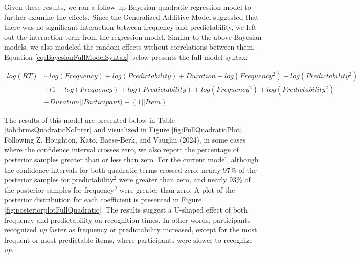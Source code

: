 \documentclass[
  man,floatsintext]{apa6}
\begin{document}
Given these results, we ran a follow-up Bayesian quadratic regression model to further examine the effects. Since the Generalized Additive Model suggested that there was no significant interaction between frequency and predictability, we left out the interaction term from the regression model. Similar to the above Bayesian models, we also modeled the random-effects without correlations between them. Equation \eqref{eq:BayesianFullModelSyntax} below presents the full model syntax:

\begin{equation}
\begin{aligned}
\label{eq:BayesianFullModelSyntax}
log(RT) & \sim  log(Frequency) + log(Predictability) + Duration + log(Frequency^2)  
+ log(Predictability^2) \\ 
& + (1 + log(Frequency) + log(Predictability) + log(Frequency^2) + log(Predictability^2) \\
& + Duration || Participant) + (1 || Item)
\end{aligned}
\end{equation}

The results of this model are presented below in Table \ref{tab:brmsQuadraticNoInter} and visualized in Figure \ref{fig:FullQuadraticPlot}. Following Z. Houghton, Kato, Baese-Berk, and Vaughn (2024), in some cases where the confidence interval crosses zero, we also report the percentage of posterior samples greater than or less than zero. For the current model, although the confidence intervals for both quadratic terms crossed zero, nearly 97\% of the posterior samples for predictability\(^2\) were greater than zero, and nearly 93\% of the posterior samples for frequency\(^2\) were greater than zero. A plot of the posterior distribution for each coefficient is presented in Figure \ref{fig:posteriorplotFullQuadratic}. The results suggest a U-shaped effect of both frequency and predictability on recognition times. In other words, participants recognized \emph{up} faster as frequency or predictability increased, except for the most frequent or most predictable items, where participants were slower to recognize \emph{up}.
\end{document}
